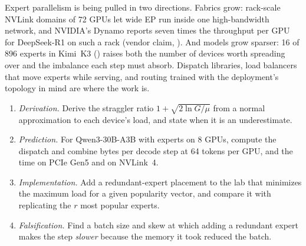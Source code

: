 
Expert parallelism is being pulled in two directions. Fabrics grow: rack-scale
NVLink domains of 72 GPUs let wide EP run inside one high-bandwidth network,
and NVIDIA's Dynamo reports seven times the throughput per GPU for DeepSeek-R1
on such a rack (vendor claim, \cite{nvidia2026dynamo}). And models grow sparser: 16 of 896 experts in
Kimi~K3 () raises both the number of devices worth
spreading over and the imbalance each step must absorb. Dispatch libraries,
load balancers that move experts while serving, and routing trained with the
deployment's topology in mind are where the work is.

\ExercisesSection

\begin{enumerate}
\item \emph{Derivation.} Derive the straggler ratio $1 + \sqrt{2\ln G/\mu}$
  from a normal approximation to each device's load, and state when it is an
  underestimate.
\item \emph{Prediction.} For Qwen3-30B-A3B with experts on 8 GPUs, compute the
  dispatch and combine bytes per decode step at 64 tokens per GPU, and the time
  on PCIe Gen5 and on NVLink~4.
\item \emph{Implementation.} Add a redundant-expert placement to the lab that
  minimizes the maximum load for a given popularity vector, and compare it with
  replicating the $r$ most popular experts.
\item \emph{Falsification.} Find a batch size and skew at which adding a
  redundant expert makes the step \emph{slower} because the memory it took
  reduced the batch.
\end{enumerate}
